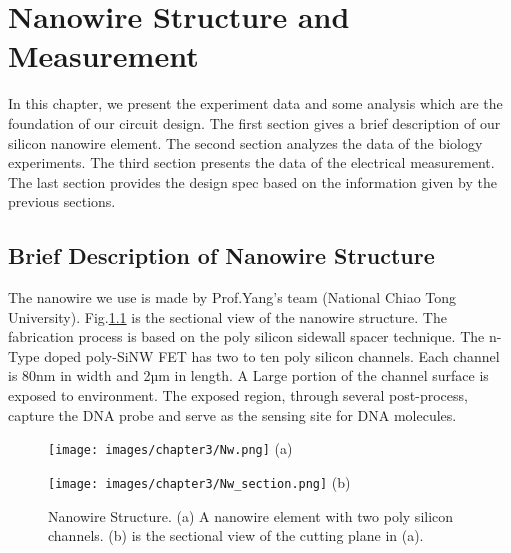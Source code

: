 \chapter{Nanowire Structure and Measurement}
In this chapter, we present the experiment data and some analysis which are the foundation of our circuit design.
The first section gives a brief description of our silicon nanowire element.
The second section analyzes the data of the biology experiments.
The third section presents the data of the electrical measurement.
The last section provides the design spec based on the information given by the previous sections.

\section{Brief Description of Nanowire Structure}
The nanowire we use is made by Prof.Yang's team (National Chiao Tong University)\cite{C5}.
Fig.\ref{fig:drawing} is the sectional view of the nanowire structure.
The fabrication process is based on the poly silicon sidewall spacer technique.
The n-Type doped poly-SiNW FET has two to ten poly silicon channels.
Each channel is 80nm in width and 2µm in length.
A Large portion of the channel surface is exposed to environment.
The exposed region, through several post-process, capture the DNA probe and serve as the sensing site for DNA molecules.\cite{C5, C6}


\begin{figure}[!htbp]
    \centering
    \begin{minipage}[t]{0.4\textwidth}
        \texttt{[image: images/chapter3/Nw.png]}
        \raggedleft
        (a)
    \end{minipage}
    \hfill
    \begin{minipage}[t]{0.4\textwidth}
        \texttt{[image: images/chapter3/Nw\_section.png]}
        \raggedleft
        (b)
    \end{minipage}
    \caption{Nanowire Structure.  (a) A nanowire element with two poly silicon channels. (b) is the sectional view of the cutting plane in (a). }
    \label{fig:drawing}
\end{figure}


